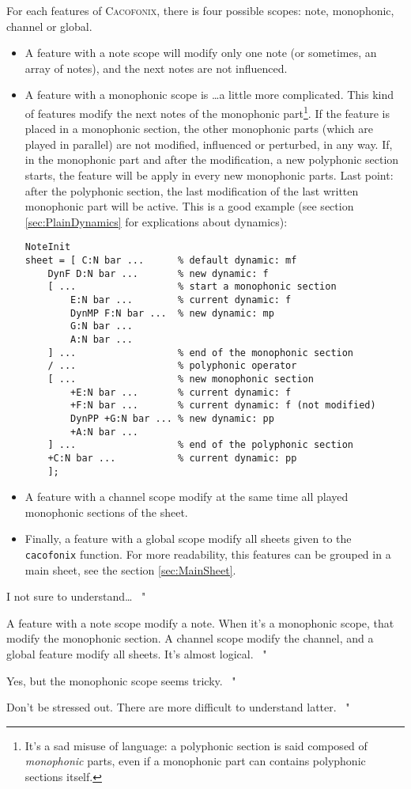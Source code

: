 \documentclass{article}
\newcommand\cacofonix{\textsc{Cacofonix}\xspace}
\newenvironment{meenv}{ \par \noindent \makebox[6em][r]{ \textcolor{mecolor}{Me}: " --~}}{~"}
\newenvironment{myselfenv}{ \par \noindent \makebox[6em][r]{ \textcolor{myselfcolor}{Myself}: " --~}}{~"}
\newcommand{ \me }[1]{%
\begin{meenv}%
	#1%
\end{meenv} }
\newcommand{ \myself }[1]{%
\begin{myselfenv}%
	#1%
\end{myselfenv} }
\begin{document}
For each features of \cacofonix, there is four possible scopes: note, monophonic, channel or global.
\begin{itemize}
	\item A feature with a note scope will modify only one note (or sometimes, an array of notes), and the next notes are not influenced.
	\item A feature with a monophonic scope is \dots a little more complicated. This kind of features modify the next notes of the monophonic part\footnote{It's a sad misuse of language: a polyphonic section is said composed of \emph{monophonic} parts, even if a monophonic part can contains polyphonic sections itself.}. If the feature is placed in a monophonic section, the other monophonic parts (which are played in parallel) are not modified, influenced or perturbed, in any way. If, in the monophonic part and after the modification, a new polyphonic section starts, the feature will be apply in every new monophonic parts. Last point: after the polyphonic section, the last modification of the last written monophonic part will be active. This is a good example (see section \ref{sec:PlainDynamics} for explications about dynamics):
\begin{lstlisting}
NoteInit
sheet = [ C:N bar ...      % default dynamic: mf
	DynF D:N bar ...       % new dynamic: f
	[ ...                  % start a monophonic section
		E:N bar ...        % current dynamic: f
		DynMP F:N bar ...  % new dynamic: mp
		G:N bar ... 
		A:N bar ...
	] ...                  % end of the monophonic section
	/ ...                  % polyphonic operator
	[ ...                  % new monophonic section
		+E:N bar ...       % current dynamic: f
		+F:N bar ...       % current dynamic: f (not modified)
		DynPP +G:N bar ... % new dynamic: pp
		+A:N bar ...
	] ...                  % end of the polyphonic section
	+C:N bar ...           % current dynamic: pp
	];
\end{lstlisting}
	\item A feature with a channel scope modify at the same time all played monophonic sections of the sheet.
	\item Finally, a feature with a global scope modify all sheets given to the \lstinline!cacofonix! function. For more readability, this features can be grouped in a main sheet, see the section \ref{sec:MainSheet}.
\end{itemize}

\me{I not sure to understand\dots}
\myself{A feature with a note scope modify a note. When it's a monophonic scope, that modify the monophonic section. A channel scope modify the channel, and a global feature modify all sheets. It's almost logical.}
\me{Yes, but the monophonic scope seems tricky.}
\myself{Don't be stressed out. There are more difficult to understand latter.}
\end{document}

